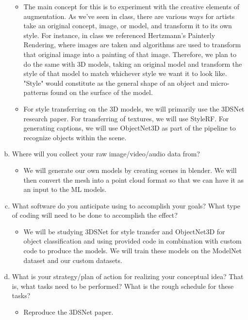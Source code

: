 \documentclass[]{article}
\begin{document}
\begin{enumerate}[(a)]
    \begin{itemize}
        \item The main concept for this is to experiment with the creative elements of augmentation. As we've seen in class, there are various ways for artists take an original concept, image, or model, and transform it to its own style. \newline \newline
        For instance, in class we referenced Hertzmann's Painterly Rendering, where images are taken and algorithms are used to transform that original image into a painting of that image. Therefore, we plan to do the same with 3D models, taking an original model and transform the style of that model to match whichever style we want it to look like. "Style" would constitute as the general shape of an object and micro-patterns found on the surface of the model.
        \item For style transferring on the 3D models, we will primarily use the 3DSNet research paper. For transferring of textures, we will use StyleRF. For generating captions, we will use ObjectNet3D as part of the pipeline to recognize objects within the scene. 
    \end{itemize} 
    \item Where will you collect your raw image/video/audio data from?
    \begin{itemize}
        \item We will generate our own models by creating scenes in blender. We will then convert the mesh into a point cloud format so that we can have it as an input to the ML models.
    \end{itemize}
    \item What software do you anticipate using to accomplish your goals? What type of coding will need to be done to accomplish the effect?
    \begin{itemize}
        \item We will be studying 3DSNet for style transfer and ObjectNet3D for object classification and using provided code in combination with custom code to produce the models. We will train these models on the ModelNet dataset and our custom datasets.
    \end{itemize} \newpage
    \item What is your strategy/plan of action for realizing your conceptual idea? That is, what tasks need to be performed? What is the rough schedule for these tasks?
    \begin{itemize}
        \item Reproduce the 3DSNet paper.

\end{itemize}
\end{enumerate}
\end{document}
